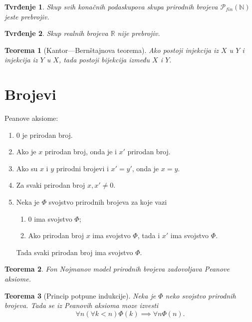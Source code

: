 \documentclass[12p,14paper]{article}
\newtheorem*{theorem}{Teorema}
\newtheorem*{prop}{Tvrđenje}
\begin{document}
\begin{multicols}{2}
    \begin{prop}
        Skup svih konačnih podaskupova skupa prirodnih brojeva 
        $\mathcal{P}_{fin} (\mathbb{N})$ jeste prebrojiv.
    \end{prop}

    \begin{prop}
        Skup realnih brojeva $\mathbb{R}$ nije prebrojiv.
    \end{prop}

    \begin{theorem}[Kantor---Bernštajnova teorema]
        Ako postoji injekcija iz $X$ u $Y$ i injekcija iz $Y$ u $X$, 
        tada postoji bijekcija između $X$ i $Y$.
    \end{theorem}

\section{Brojevi}

    Peanove aksiome:
    \begin{enumerate}
        \itemsep0em
        \item [P.1] 0 je prirodan broj.
        \item [P.2] Ako je $x$ prirodan broj, onda je i $x'$ prirodan broj.
        \item [P.3] Ako su $x$ i $y$ prirodni brojevi i $x' = y'$, 
            onda je $x = y$.
        \item [P.4] Za svaki prirodan broj $x, x' \neq 0$.
        \item [P.5] Neka je $\Phi$ svojstvo prirodnih brojeva za koje vazi
            \begin{enumerate}
                \itemsep0em
                \item 0 ima svojstvo $\Phi$;
                \item Ako prirodan broj $x$ ima svojstvo $\Phi$, tada i $x'$ 
                    ima svojstvo $\Phi$.
            \end{enumerate}
            Tada svaki prirodan broj ima svojstvo $\Phi$.
    \end{enumerate}

    \begin{theorem}
        Fon Nojmanov model prirodnih brojeva zadovoljava Peanove aksiome.
    \end{theorem}

    \begin{theorem}[Princip potpune indukcije]
        Neka je $\Phi$ neko svojstvo prirodnih brojeva. Tada se iz Peanovih 
        aksioma moze izvesti
        \[\forall n (\forall k < n) \Phi (k) \implies \forall n \Phi (n).\]
    \end{theorem}
    

\end{multicols}
\end{document}
